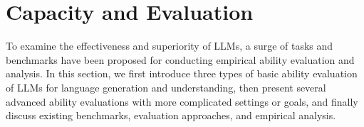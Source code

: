 \section{Capacity and Evaluation}
\label{sec-evaluation}
To examine the effectiveness and superiority of LLMs, a surge of tasks and benchmarks have been proposed for conducting empirical ability evaluation and analysis.
In this section, we first introduce three types of basic ability evaluation of LLMs for language generation and understanding, then present several advanced ability evaluations with more complicated settings or goals, and finally discuss existing benchmarks, evaluation approaches, and empirical analysis.




